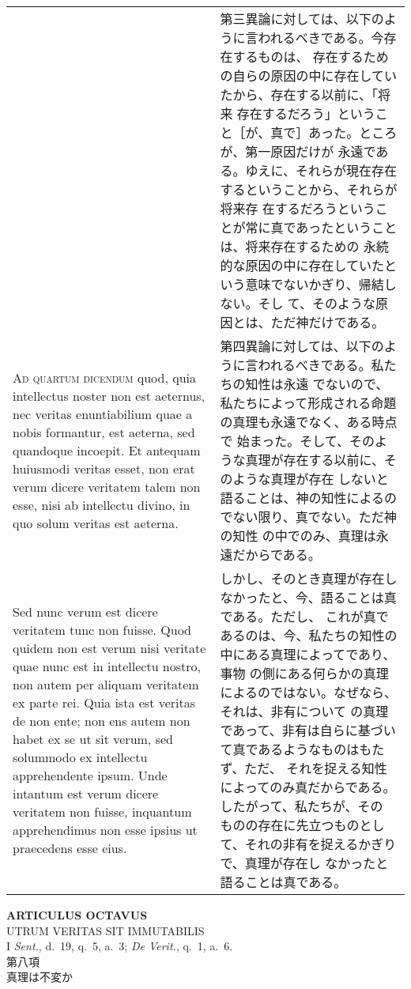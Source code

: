 \documentclass[10pt]{jsarticle} %
\begin{document}
\begin{longtable}{p{21em}p{21em}}
&

第三異論に対しては、以下のように言われるべきである。今存在するものは、
存在するための自らの原因の中に存在していたから、存在する以前に、「将来
存在するだろう」ということ［が、真で］あった。ところが、第一原因だけが
永遠である。ゆえに、それらが現在存在するということから、それらが将来存
在するだろうということが常に真であったということは、将来存在するための
永続的な原因の中に存在していたという意味でないかぎり、帰結しない。そし
て、そのような原因とは、ただ神だけである。

\\



{\scshape Ad quartum dicendum} quod, quia intellectus noster non est
aeternus, nec veritas enuntiabilium quae a nobis formantur, est
aeterna, sed quandoque incoepit. Et antequam huiusmodi veritas esset,
non erat verum dicere veritatem talem non esse, nisi ab intellectu
divino, in quo solum veritas est aeterna.

&

第四異論に対しては、以下のように言われるべきである。私たちの知性は永遠
でないので、私たちによって形成される命題の真理も永遠でなく、ある時点で
始まった。そして、そのような真理が存在する以前に、そのような真理が存在
しないと語ることは、神の知性によるのでない限り、真でない。ただ神の知性
の中でのみ、真理は永遠だからである。

\\

Sed nunc verum est dicere veritatem tunc non fuisse. Quod quidem non
est verum nisi veritate quae nunc est in intellectu nostro, non autem
per aliquam veritatem ex parte rei. Quia ista est veritas de non ente;
non ens autem non habet ex se ut sit verum, sed solummodo ex
intellectu apprehendente ipsum. Unde intantum est verum dicere
veritatem non fuisse, inquantum apprehendimus non esse ipsius ut
praecedens esse eius.

&

しかし、そのとき真理が存在しなかったと、今、語ることは真である。ただし、
これが真であるのは、今、私たちの知性の中にある真理によってであり、事物
の側にある何らかの真理によるのではない。なぜなら、それは、非有について
の真理であって、非有は自らに基づいて真であるようなものはもたず、ただ、
それを捉える知性によってのみ真だからである。したがって、私たちが、その
ものの存在に先立つものとして、それの非有を捉えるかぎりで、真理が存在し
なかったと語ることは真である。
\end{longtable}
\newpage

\begin{center}
 {\Large {\bf ARTICULUS OCTAVUS}}\\
 {\large UTRUM VERITAS SIT IMMUTABILIS}\\
 {\footnotesize I {\itshape Sent.}, d.~19, q.~5, a.~3; {\itshape De
 Verit.}, q.~1, a.~6.}\\
 {\Large 第八項\\真理は不変か}
\end{center}
\end{document}
